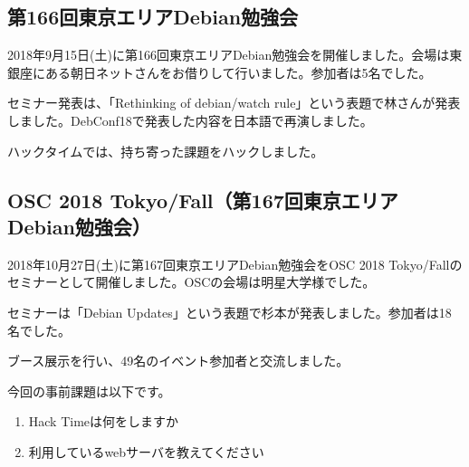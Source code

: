 \documentclass[mingoth,a4paper]{jsarticle}
\begin{document}

\subsection{第166回東京エリアDebian勉強会}

2018年9月15日(土)に第166回東京エリアDebian勉強会を開催しました。会場は東銀座にある朝日ネットさんをお借りして行いました。参加者は5名でした。

セミナー発表は、「Rethinking of debian/watch rule」という表題で林さんが発表しました。DebConf18で発表した内容を日本語で再演しました。

ハックタイムでは、持ち寄った課題をハックしました。

\subsection{OSC 2018 Tokyo/Fall（第167回東京エリアDebian勉強会）}

2018年10月27日(土)に第167回東京エリアDebian勉強会をOSC 2018 Tokyo/Fallのセミナーとして開催しました。OSCの会場は明星大学様でした。

セミナーは「Debian Updates」という表題で杉本が発表しました。参加者は18名でした。

ブース展示を行い、49名のイベント参加者と交流しました。



今回の事前課題は以下です。

\begin{enumerate}
\item Hack Timeは何をしますか
\item 利用しているwebサーバを教えてください
\end{enumerate}


\begin{multicols}{2}
{\small

}
\end{multicols}

%
%
%
%
\end{document}
